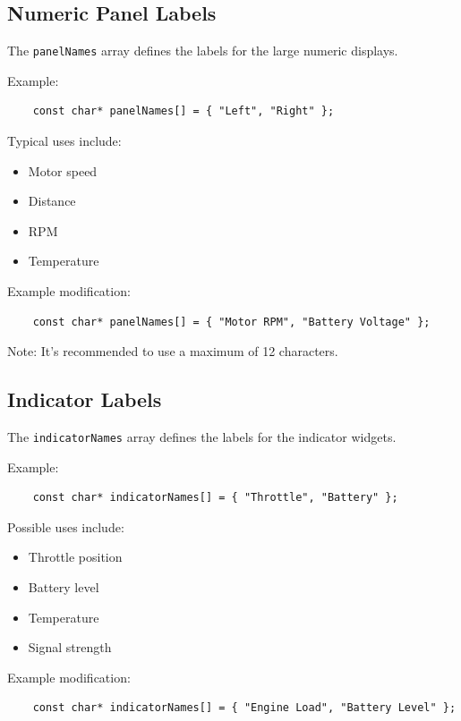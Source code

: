 \subsection{Numeric Panel Labels}

The \texttt{panelNames} array defines the labels for the large numeric
displays.

Example:

\begin{verbatim}
	const char* panelNames[] = { "Left", "Right" };
\end{verbatim}

Typical uses include:

\begin{itemize}
	\item Motor speed
	\item Distance
	\item RPM
	\item Temperature
\end{itemize}

Example modification:

\begin{verbatim}
	const char* panelNames[] = { "Motor RPM", "Battery Voltage" };
\end{verbatim}

Note: It's recommended to use a maximum of 12 characters.

\subsection{Indicator Labels}

The \texttt{indicatorNames} array defines the labels for the indicator
widgets.

Example:

\begin{verbatim}
	const char* indicatorNames[] = { "Throttle", "Battery" };
\end{verbatim}

Possible uses include:

\begin{itemize}
	\item Throttle position
	\item Battery level
	\item Temperature
	\item Signal strength
\end{itemize}

Example modification:

\begin{verbatim}
	const char* indicatorNames[] = { "Engine Load", "Battery Level" };
\end{verbatim}

